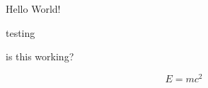 \documentclass{article}
\begin{document}
Hello World!

testing 

is this working?

\begin{equation}
  E = mc^2
\end{equation}
\end{document}

